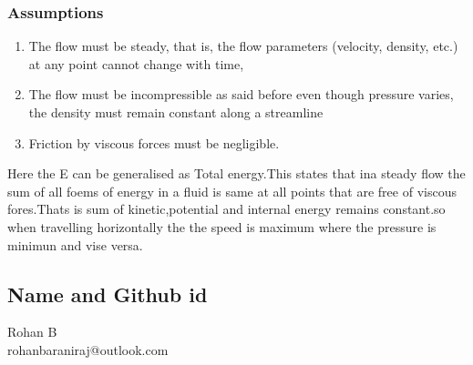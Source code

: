 \subsubsection{Assumptions}
\begin{enumerate}
	\item The flow must be steady, that is, the flow parameters (velocity, density, etc.) at any point cannot change with time,
	\item The flow must be incompressible as said before even though pressure varies, the density must remain constant along a streamline
        \item Friction by viscous forces must be negligible.
\end{enumerate}
Here the E can be generalised as Total energy.This states that ina steady flow the sum of all foems of energy in a fluid is same at all points that are free of viscous fores.Thats is sum of kinetic,potential and internal energy remains constant.so when travelling horizontally the
the speed is maximum where the pressure is minimun and vise versa.



\subsection{Name and Github id}
Rohan B \\ 
rohanbaraniraj@outlook.com






%
